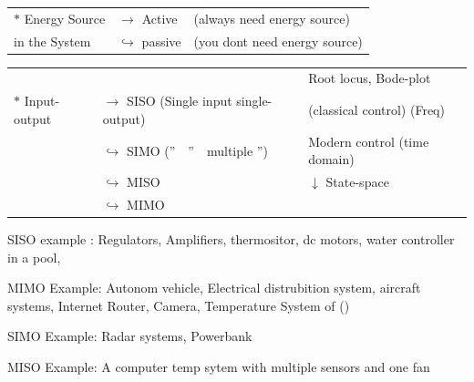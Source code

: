 \documentclass[11pt,a4paper]{article}
\begin{document}
\medskip
\noindent
\begin{tabular}{@{}l l l@{}}
\textcolor{kirmizikalem}{$\ast$} Energy Source & $\longrightarrow$ Active & \textcolor{turuncukalem}{(always need energy source)}\\
\phantom{$\ast$} in the System & $\hookrightarrow$ passive & \textcolor{turuncukalem}{(you dont need energy source)}
\end{tabular}

\medskip
\noindent
\begin{tabular}{@{}l l l@{}}
 & & \textcolor{turuncukalem}{Root locus, Bode-plot}\\
\textcolor{kirmizikalem}{$\ast$} Input-output & $\rightarrow$ SISO (Single input single-output) & \textcolor{turuncukalem}{(classical control) (Freq)}\\
 & $\hookrightarrow$ SIMO (''\ \ ''\ \ multiple '') & \textcolor{turuncukalem}{Modern control (time domain)}\\
 & $\hookrightarrow$ MISO & \textcolor{turuncukalem}{$\downarrow$ State-space}\\
 & $\hookrightarrow$ MIMO &
\end{tabular}

\bigskip
\noindent\textcolor{murekkep}{SISO example :} Regulators, Amplifiers, thermositor, dc motors, water controller in a pool,

\medskip
\noindent\textcolor{murekkep}{MIMO Example:} Autonom vehicle, Electrical distrubition system, aircraft systems, Internet Router, Camera, Temperature System of ()

\medskip
\noindent\textcolor{murekkep}{SIMO Example:} Radar systems, Powerbank

\medskip
\noindent\textcolor{murekkep}{MISO Example:} A computer temp sytem with multiple sensors and one fan
\end{document}
